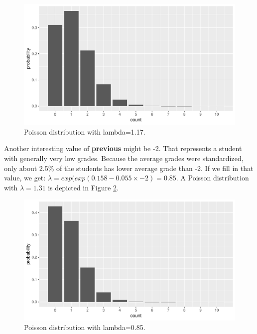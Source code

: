 \documentclass[]{report}\usepackage[]{graphicx}\usepackage[]{color}
\makeatletter
\def\maxwidth{ %
  \ifdim\Gin@nat@width>\linewidth
    \linewidth
  \else
    \Gin@nat@width
  \fi
}
\newenvironment{knitrout}{}{} %
\makeatother
\begin{document}
\begin{knitrout}
\color{fgcolor}\begin{figure}

{\centering \includegraphics[width=\maxwidth]{figure/gen_16-1} 

}

\caption[Poisson distribution with lambda=1.17]{Poisson distribution with lambda=1.17.}\label{fig:gen_16}
\end{figure}


\end{knitrout}

Another interesting value of \textbf{previous} might be -2. That represents a student with generally very low grades. Because the average grades were standardized, only about 2.5\% of the students has lower average grade than -2. If we fill in that value, we get: $\lambda=exp(exp(0.158  -0.055 \times -2)= 0.85$. A Poisson distribution with $\lambda=1.31$ is depicted in Figure \ref{fig:gen_17}.

\begin{knitrout}
\color{fgcolor}\begin{figure}

{\centering \includegraphics[width=\maxwidth]{figure/gen_17-1} 

}

\caption[Poisson distribution with lambda=0.85]{Poisson distribution with lambda=0.85.}\label{fig:gen_17}
\end{figure}


\end{knitrout}
\end{document}
